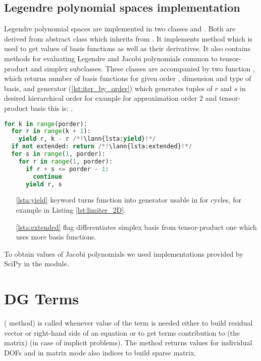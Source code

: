 \subsection{Legendre polynomial spaces implementation}
Legendre polynomial spaces are implemented in two classes 
 and 
. Both are derived from abstract class 
 which inherits from \sfepy{} 
. It implements method  which is used to get values of basis 
functions as well as their derivatives. It also contains methods for evaluating Legendre and Jacobi 
polynomials common to tensor-product and simplex subclasses. These classes are accompanied by two 
function , which returns number of basis functions for given order , dimension 
and type of basis, and generator  (\ref{lst:iter_by_order}) which generates 
tuples of $r$ and $s$ in desired hierarchical order for example for approximation order $2$ and 
tensor-product basis this is: 
. 
\setcounter{lstannotation}{0}
\begin{lstlisting}[language=Python, caption= Iteration over $r$ and $s$ 
indicies of basis functions \label{lst:iter_by_order}]
for k in range(porder):
  for r in range(k + 1):
    yield r, k - r /*!\lann{lsta:yield}!*/
  if not extended: return /*!\lann{lsta:extended}!*/
  for s in range(1, porder):
    for r in range(1, porder):
      if r + s <= porder - 1:
        continue
      yield r, s
\end{lstlisting}
\begin{itemize}
    \item[\ref{lsta:yield}]  keyword turns function into generator usable in for 
    cycles, for example in Listing \ref{lst:limiter_2D}.
    \item[\ref{lsta:extended}]  flag differentiates simplex basis from 
    tensor-product one which uses more basis functions.
\end{itemize}
To obtain values of Jacobi polynomials we used implementations provided by SciPy in the 
 module.


\section{DG Terms}
(\todo {} method) is called whenever value of the term is needed either 
to build residual vector or right-hand side of an equation or to get terms contribution 
to (\todo the matrix) (in case of implicit problems). The method returns values for 
individual DOFs and in matrix mode also indices to build sparse matrix.

